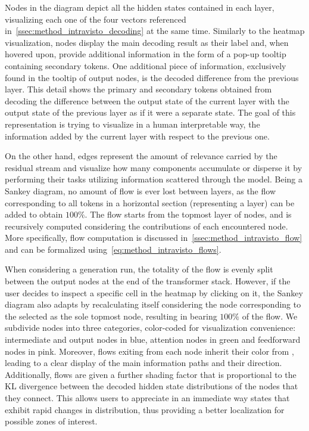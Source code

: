 Nodes in the diagram depict all the hidden states contained in each layer, visualizing each one of the four vectors referenced in~\cref{ssec:method_intravisto_decoding} at the same time.
Similarly to the heatmap visualization, nodes display the main decoding result as their label and, when hovered upon, provide additional information in the form of a pop-up tooltip containing secondary tokens.
One additional piece of information, exclusively found in the tooltip of output nodes, is the decoded difference from the previous layer.
This detail shows the primary and secondary tokens obtained from decoding the difference between the output state of the current layer with the output state of the previous layer as if it were a separate state.
The goal of this representation is trying to visualize in a human interpretable way, the information added by the current layer with respect to the previous one.

On the other hand, edges represent the amount of relevance carried by the residual stream and visualize how many components accumulate or disperse it by performing their tasks utilizing information scattered through the model.
Being a Sankey diagram, no amount of flow is ever lost between layers, as the flow corresponding to all tokens in a horizontal section (representing a layer) can be added to obtain $100\%$.
The flow starts from the topmost layer of nodes, and is recursively computed considering the contributions of each encountered node.
More specifically, flow computation is discussed  in~\cref{ssec:method_intravisto_flow} and can be formalized using~\cref{eq:method_intravisto_flows}.

When considering a  generation run, the totality of the flow is evenly split between the output nodes at the end of the transformer stack.
However, if the user decides to inspect a specific cell in the heatmap by clicking on it, the Sankey diagram also adapts by recalculating itself considering the node corresponding to the selected as the sole topmost node, resulting in  bearing $100\%$ of the flow.
We subdivide nodes into three categories, color-coded for visualization convenience: intermediate and output nodes in blue, attention nodes in green and feedforward nodes in pink.
Moreover, flows exiting from each node inherit their color from , leading to a clear display of the main information paths and their direction.
Additionally, flows are given a further shading factor that is proportional to the KL divergence between the decoded hidden state distributions of the nodes that they connect.
This allows users to appreciate in an immediate way states that exhibit rapid changes in distribution, thus providing a better localization for possible zones of interest.

